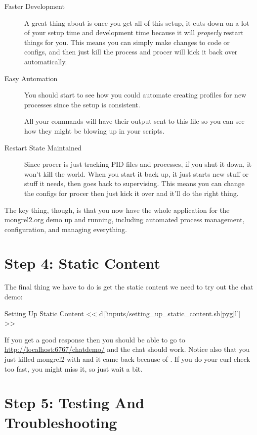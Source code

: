 \begin{description}
\item [Faster Development]  A great thing about  is once you get all of this setup,
    it cuts down on a lot of your setup time and development time because
    it will \emph{properly} restart things for you.  This means you can
    simply make changes to code or configs, and then just kill the process and
    procer will kick it back over automatically.
\item [Easy Automation]  You should start to see how you could automate creating
    profiles for new processes since the setup is consistent.
  \item []  All your commands will have their output sent to
    this file so you can see how they might be blowing up in your scripts.
\item [Restart State Maintained]  Since procer is just tracking PID files and
    processes, if you shut it down, it won't kill the world.  When you start
    it back up, it just starts new stuff or stuff it needs, then goes back to
    supervising.  This means you can change the configs for procer then just
    kick it over and it'll do the right thing.
\end{description}

The key thing, though, is that you now have the whole application for
the mongrel2.org demo up and running, including automated process management,
configuration, and managing everything.

\section{Step 4: Static Content}

The final thing we have to do is get the static content we need to try
out the chat demo:

\begin{code}{Setting Up Static Content}
<< d['inputs/setting_up_static_content.sh|pyg|l'] >>
\end{code}

If you get a good response then you should be able to go to
\url{http://localhost:6767/chatdemo/} and the chat should work.  Notice
also that you just killed mongrel2 with  and it came back
because of .  If you do your curl check too fast,
you might miss it, so just wait a bit.

\section{Step 5: Testing And Troubleshooting}

